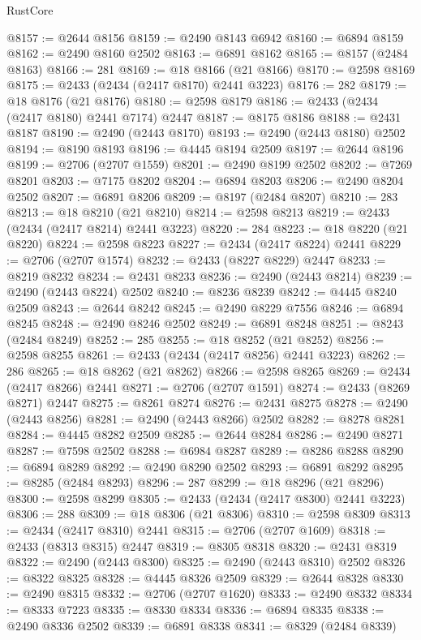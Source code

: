 \begin{lexlean}{RustCore}
\begin{coremodule}
@8157 := @2644 @8156
@8159 := @2490 @8143 @6942
@8160 := @6894 @8159
@8162 := @2490 @8160 @2502
@8163 := @6891 @8162
@8165 := @8157 (@2484 @8163)
@8166 := 281
@8169 := @18 @8166 (@21 @8166)
@8170 := @2598 @8169
@8175 := @2433 (@2434 (@2417 @8170) @2441 @3223)
@8176 := 282
@8179 := @18 @8176 (@21 @8176)
@8180 := @2598 @8179
@8186 := @2433 (@2434 (@2417 @8180) @2441 @7174) @2447
@8187 := @8175 @8186
@8188 := @2431 @8187
@8190 := @2490 (@2443 @8170)
@8193 := @2490 (@2443 @8180) @2502
@8194 := @8190 @8193
@8196 := @4445 @8194 @2509
@8197 := @2644 @8196
@8199 := @2706 (@2707 @1559)
@8201 := @2490 @8199 @2502
@8202 := @7269 @8201
@8203 := @7175 @8202
@8204 := @6894 @8203
@8206 := @2490 @8204 @2502
@8207 := @6891 @8206
@8209 := @8197 (@2484 @8207)
@8210 := 283
@8213 := @18 @8210 (@21 @8210)
@8214 := @2598 @8213
@8219 := @2433 (@2434 (@2417 @8214) @2441 @3223)
@8220 := 284
@8223 := @18 @8220 (@21 @8220)
@8224 := @2598 @8223
@8227 := @2434 (@2417 @8224) @2441
@8229 := @2706 (@2707 @1574)
@8232 := @2433 (@8227 @8229) @2447
@8233 := @8219 @8232
@8234 := @2431 @8233
@8236 := @2490 (@2443 @8214)
@8239 := @2490 (@2443 @8224) @2502
@8240 := @8236 @8239
@8242 := @4445 @8240 @2509
@8243 := @2644 @8242
@8245 := @2490 @8229 @7556
@8246 := @6894 @8245
@8248 := @2490 @8246 @2502
@8249 := @6891 @8248
@8251 := @8243 (@2484 @8249)
@8252 := 285
@8255 := @18 @8252 (@21 @8252)
@8256 := @2598 @8255
@8261 := @2433 (@2434 (@2417 @8256) @2441 @3223)
@8262 := 286
@8265 := @18 @8262 (@21 @8262)
@8266 := @2598 @8265
@8269 := @2434 (@2417 @8266) @2441
@8271 := @2706 (@2707 @1591)
@8274 := @2433 (@8269 @8271) @2447
@8275 := @8261 @8274
@8276 := @2431 @8275
@8278 := @2490 (@2443 @8256)
@8281 := @2490 (@2443 @8266) @2502
@8282 := @8278 @8281
@8284 := @4445 @8282 @2509
@8285 := @2644 @8284
@8286 := @2490 @8271
@8287 := @7598 @2502
@8288 := @6984 @8287
@8289 := @8286 @8288
@8290 := @6894 @8289
@8292 := @2490 @8290 @2502
@8293 := @6891 @8292
@8295 := @8285 (@2484 @8293)
@8296 := 287
@8299 := @18 @8296 (@21 @8296)
@8300 := @2598 @8299
@8305 := @2433 (@2434 (@2417 @8300) @2441 @3223)
@8306 := 288
@8309 := @18 @8306 (@21 @8306)
@8310 := @2598 @8309
@8313 := @2434 (@2417 @8310) @2441
@8315 := @2706 (@2707 @1609)
@8318 := @2433 (@8313 @8315) @2447
@8319 := @8305 @8318
@8320 := @2431 @8319
@8322 := @2490 (@2443 @8300)
@8325 := @2490 (@2443 @8310) @2502
@8326 := @8322 @8325
@8328 := @4445 @8326 @2509
@8329 := @2644 @8328
@8330 := @2490 @8315
@8332 := @2706 (@2707 @1620)
@8333 := @2490 @8332
@8334 := @8333 @7223
@8335 := @8330 @8334
@8336 := @6894 @8335
@8338 := @2490 @8336 @2502
@8339 := @6891 @8338
@8341 := @8329 (@2484 @8339)

\end{coremodule}
\end{lexlean}
